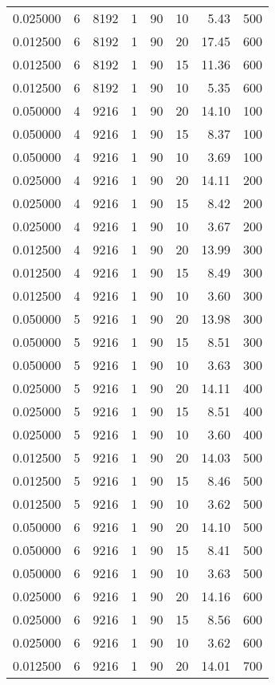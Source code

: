 \documentclass[12pt,letterpaper]{article}
\begin{document}
\begin{center}
\begin{longtable}{r|r|r|r|r|r|r|r}
0.025000 & 6 & 8192 & 1 & 90 & 10 & 5.43 & 500 \\
0.012500 & 6 & 8192 & 1 & 90 & 20 & 17.45 & 600 \\
0.012500 & 6 & 8192 & 1 & 90 & 15 & 11.36 & 600 \\
0.012500 & 6 & 8192 & 1 & 90 & 10 & 5.35 & 600 \\
0.050000 & 4 & 9216 & 1 & 90 & 20 & 14.10 & 100 \\
0.050000 & 4 & 9216 & 1 & 90 & 15 & 8.37 & 100 \\
0.050000 & 4 & 9216 & 1 & 90 & 10 & 3.69 & 100 \\
0.025000 & 4 & 9216 & 1 & 90 & 20 & 14.11 & 200 \\
0.025000 & 4 & 9216 & 1 & 90 & 15 & 8.42 & 200 \\
0.025000 & 4 & 9216 & 1 & 90 & 10 & 3.67 & 200 \\
0.012500 & 4 & 9216 & 1 & 90 & 20 & 13.99 & 300 \\
0.012500 & 4 & 9216 & 1 & 90 & 15 & 8.49 & 300 \\
0.012500 & 4 & 9216 & 1 & 90 & 10 & 3.60 & 300 \\
0.050000 & 5 & 9216 & 1 & 90 & 20 & 13.98 & 300 \\
0.050000 & 5 & 9216 & 1 & 90 & 15 & 8.51 & 300 \\
0.050000 & 5 & 9216 & 1 & 90 & 10 & 3.63 & 300 \\
0.025000 & 5 & 9216 & 1 & 90 & 20 & 14.11 & 400 \\
0.025000 & 5 & 9216 & 1 & 90 & 15 & 8.51 & 400 \\
0.025000 & 5 & 9216 & 1 & 90 & 10 & 3.60 & 400 \\
0.012500 & 5 & 9216 & 1 & 90 & 20 & 14.03 & 500 \\
0.012500 & 5 & 9216 & 1 & 90 & 15 & 8.46 & 500 \\
0.012500 & 5 & 9216 & 1 & 90 & 10 & 3.62 & 500 \\
0.050000 & 6 & 9216 & 1 & 90 & 20 & 14.10 & 500 \\
0.050000 & 6 & 9216 & 1 & 90 & 15 & 8.41 & 500 \\
0.050000 & 6 & 9216 & 1 & 90 & 10 & 3.63 & 500 \\
0.025000 & 6 & 9216 & 1 & 90 & 20 & 14.16 & 600 \\
0.025000 & 6 & 9216 & 1 & 90 & 15 & 8.56 & 600 \\
0.025000 & 6 & 9216 & 1 & 90 & 10 & 3.62 & 600 \\
0.012500 & 6 & 9216 & 1 & 90 & 20 & 14.01 & 700 \\

\end{longtable}
\end{center}
\end{document}
